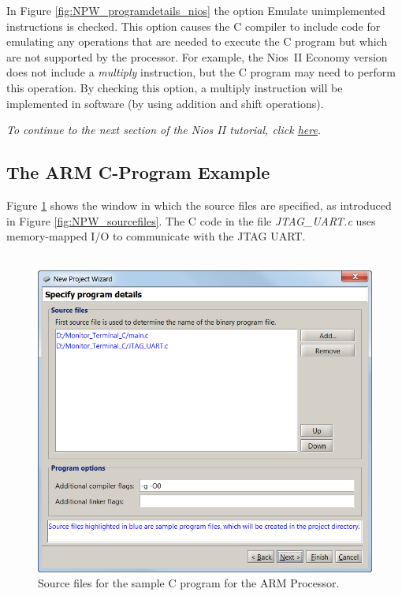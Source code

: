 \documentclass[11pt, twoside, pdftex]{article}
\begin{document}
In Figure \ref{fig:NPW_programdetails_nios} the option {\sf Emulate unimplemented instructions}
is checked. This option causes the C compiler to include code for
emulating any operations that are needed to execute the C program
but which are not supported by the processor. For example, the
Nios~II Economy version does not include a {\it multiply}
instruction, but the C program may need to perform this
operation. By checking this option, a multiply instruction 
will be implemented in software (by using addition and shift
operations).

{\it To continue to the next section of the Nios II tutorial, click \hyperref[tut:nios_8]{here}.}

\newpage
\subsection{The ARM C-Program Example}
\label{tut:arm_6}

Figure \ref{fig:NPW_programdetails_arm} shows the window in which the source files are
specified, as introduced in Figure \ref{fig:NPW_sourcefiles}.
The C code in the file {\it JTAG\_UART.c} uses memory-mapped 
I/O to communicate with the JTAG UART.
~\\~\\

\begin{figure}[H]
   \begin{center}
      \includegraphics[scale=1]{screenshots/figure48.png}
   \end{center}
   \caption{Source files for the sample C program for the ARM Processor.} 
   \label{fig:NPW_programdetails_arm}
\end{figure}
\end{document}
